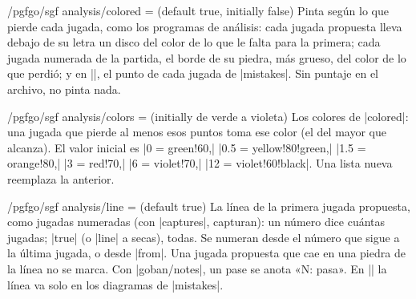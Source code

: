 \begin{key}{/pgfgo/sgf analysis/colored =  (default true, initially false)}
	Pinta según lo que pierde cada jugada, como los programas de análisis: cada jugada propuesta lleva debajo de su letra un disco del color de lo que le falta para la primera; cada jugada numerada de la partida, el borde de su piedra, más grueso, del color de lo que perdió; y en |\sgfgraph|, el punto de cada jugada de |mistakes|. Sin puntaje en el archivo, no pinta nada.

	\begin{codeexample}[]
		\begin{goban}[9, scale = 0.6]
		\end{goban}
	\end{codeexample}
\end{key}

\begin{key}{/pgfgo/sgf analysis/colors =  (initially de verde a violeta)}
	Los colores de |colored|: una jugada que pierde al menos esos puntos toma ese color (el del mayor que alcanza). El valor inicial es |{0 = green!60,| |0.5 = yellow!80!green,| |1.5 = orange!80,| |3 = red!70,| |6 = violet!70,| |12 = violet!60!black}|. Una lista nueva reemplaza la anterior.

	\begin{codeexample}[]
		\begin{goban}[9, scale = 0.6]
		\end{goban}
	\end{codeexample}
\end{key}

\begin{key}{/pgfgo/sgf analysis/line =  (default true)}
	La línea de la primera jugada propuesta, como jugadas numeradas (con |captures|, capturan): un número dice cuántas jugadas; |true| (o |line| a secas), todas. Se numeran desde el número que sigue a la última jugada, o desde |from|. Una jugada propuesta que cae en una piedra de la línea no se marca. Con |goban/notes|, un pase se anota «N: pasa». En |\sgfdiagrams| la línea va solo en los diagramas de |mistakes|.

	\begin{codeexample}[]
		\begin{goban}[9, scale = 0.6, notes]
		\end{goban}
	\end{codeexample}
\end{key}

